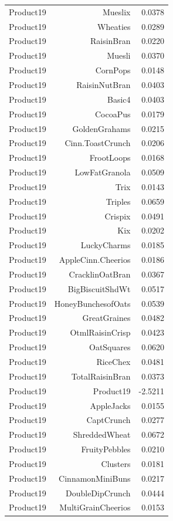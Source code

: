 \begin{longtable}{@{}lrr@{}}
Product19 & Mueslix & 0.0378 \\
Product19 & Wheaties & 0.0289 \\
Product19 & RaisinBran & 0.0220 \\
Product19 & Muesli & 0.0370 \\
Product19 & CornPops & 0.0148 \\
Product19 & RaisinNutBran & 0.0403 \\
Product19 & Basic4 & 0.0403 \\
Product19 & CocoaPus & 0.0179 \\
Product19 & GoldenGrahams & 0.0215 \\
Product19 & Cinn.ToastCrunch & 0.0206 \\
Product19 & FrootLoops & 0.0168 \\
Product19 & LowFatGranola & 0.0509 \\
Product19 & Trix & 0.0143 \\
Product19 & Triples & 0.0659 \\
Product19 & Crispix & 0.0491 \\
Product19 & Kix & 0.0202 \\
Product19 & LuckyCharms & 0.0185 \\
Product19 & AppleCinn.Cheerios & 0.0186 \\
Product19 & CracklinOatBran & 0.0367 \\
Product19 & BigBiscuitShdWt & 0.0517 \\
Product19 & HoneyBunchesofOats & 0.0539 \\
Product19 & GreatGraines & 0.0482 \\
Product19 & OtmlRaisinCrisp & 0.0423 \\
Product19 & OatSquares & 0.0620 \\
Product19 & RiceChex & 0.0481 \\
Product19 & TotalRaisinBran & 0.0373 \\
Product19 & Product19 & -2.5211 \\
Product19 & AppleJacks & 0.0155 \\
Product19 & CaptCrunch & 0.0277 \\
Product19 & ShreddedWheat & 0.0672 \\
Product19 & FruityPebbles & 0.0210 \\
Product19 & Clusters & 0.0181 \\
Product19 & CinnamonMiniBuns & 0.0217 \\
Product19 & DoubleDipCrunch & 0.0444 \\
Product19 & MultiGrainCheerios & 0.0153 \\

\end{longtable}
